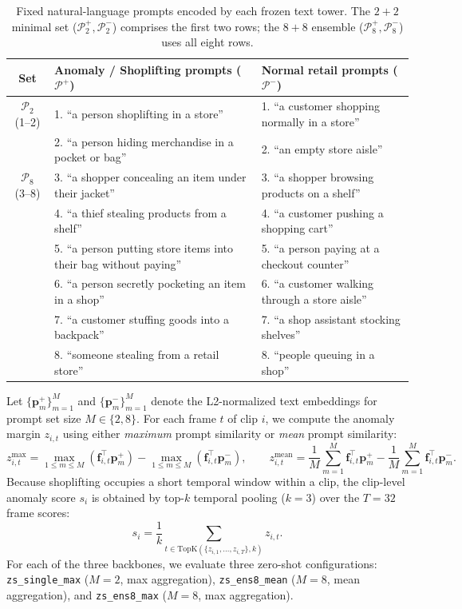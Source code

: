 \documentclass[pdflatex,sn-mathphys-num]{sn-jnl}
\begin{document}
\begin{table}[ht!]
\caption{Fixed natural-language prompts encoded by each frozen text tower. The $2+2$ minimal set ($\mathcal{P}_2^+, \mathcal{P}_2^-$) comprises the first two rows; the $8+8$ ensemble ($\mathcal{P}_8^+, \mathcal{P}_8^-$) uses all eight rows.}\label{tab:prompts}
\footnotesize
\begin{tabular*}{\textwidth}{@{\extracolsep{\fill}}cp{}p{}@{}}
\toprule
Set & Anomaly / Shoplifting prompts ($\mathcal{P}^+$) & Normal retail prompts ($\mathcal{P}^-$) \\
\midrule
$\mathcal{P}_2$ (1--2) & 1. ``a person shoplifting in a store'' & 1. ``a customer shopping normally in a store'' \\
 & 2. ``a person hiding merchandise in a pocket or bag'' & 2. ``an empty store aisle'' \\
\midrule
$\mathcal{P}_8$ (3--8) & 3. ``a shopper concealing an item under their jacket'' & 3. ``a shopper browsing products on a shelf'' \\
 & 4. ``a thief stealing products from a shelf'' & 4. ``a customer pushing a shopping cart'' \\
 & 5. ``a person putting store items into their bag without paying'' & 5. ``a person paying at a checkout counter'' \\
 & 6. ``a person secretly pocketing an item in a shop'' & 6. ``a customer walking through a store aisle'' \\
 & 7. ``a customer stuffing goods into a backpack'' & 7. ``a shop assistant stocking shelves'' \\
 & 8. ``someone stealing from a retail store'' & 8. ``people queuing in a shop'' \\
\bottomrule
\end{tabular*}
\end{table}

Let $\{\mathbf{p}_m^+\}_{m=1}^M$ and $\{\mathbf{p}_m^-\}_{m=1}^M$ denote the L2-normalized text embeddings for prompt set size $M \in \{2, 8\}$. For each frame $t$ of clip $i$, we compute the anomaly margin $z_{i,t}$ using either \emph{maximum} prompt similarity or \emph{mean} prompt similarity:
\begin{equation}
z_{i,t}^{\text{max}} = \max_{1 \le m \le M} (\mathbf{f}_{i,t}^\top \mathbf{p}_m^+) - \max_{1 \le m \le M} (\mathbf{f}_{i,t}^\top \mathbf{p}_m^-), \qquad
z_{i,t}^{\text{mean}} = \frac{1}{M}\sum_{m=1}^M \mathbf{f}_{i,t}^\top \mathbf{p}_m^+ - \frac{1}{M}\sum_{m=1}^M \mathbf{f}_{i,t}^\top \mathbf{p}_m^-.
\label{eq:zs_frame}
\end{equation}
Because shoplifting occupies a short temporal window within a clip, the clip-level anomaly score $s_i$ is obtained by top-$k$ temporal pooling ($k = 3$) over the $T = 32$ frame scores:
\begin{equation}
s_i = \frac{1}{k} \sum_{t \in \text{TopK}(\{z_{i,1}, \dots, z_{i,T}\}, k)} z_{i,t}.
\label{eq:topk_pool}
\end{equation}
For each of the three backbones, we evaluate three zero-shot configurations: \texttt{zs\_single\_max} ($M=2$, max aggregation), \texttt{zs\_ens8\_mean} ($M=8$, mean aggregation), and \texttt{zs\_ens8\_max} ($M=8$, max aggregation).
\end{document}
